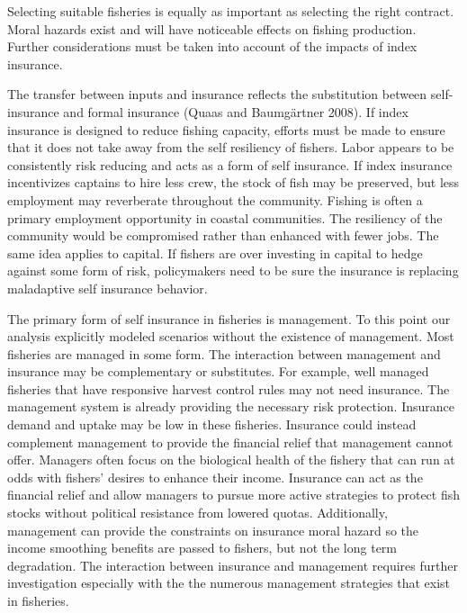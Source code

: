 \documentclass[
  letterpaper,
  DIV=11,
  numbers=noendperiod]{scrartcl}
\theoremstyle{plain}
\theoremstyle{plain}
\theoremstyle{remark}
\begin{document}
Selecting suitable fisheries is equally as important as selecting the
right contract. Moral hazards exist and will have noticeable effects on
fishing production. Further considerations must be taken into account of
the impacts of index insurance.

The transfer between inputs and insurance reflects the substitution
between self-insurance and formal insurance (Quaas and Baumgärtner
2008). If index insurance is designed to reduce fishing capacity,
efforts must be made to ensure that it does not take away from the self
resiliency of fishers. Labor appears to be consistently risk reducing
and acts as a form of self insurance. If index insurance incentivizes
captains to hire less crew, the stock of fish may be preserved, but less
employment may reverberate throughout the community. Fishing is often a
primary employment opportunity in coastal communities. The resiliency of
the community would be compromised rather than enhanced with fewer jobs.
The same idea applies to capital. If fishers are over investing in
capital to hedge against some form of risk, policymakers need to be sure
the insurance is replacing maladaptive self insurance behavior.

The primary form of self insurance in fisheries is management. To this
point our analysis explicitly modeled scenarios without the existence of
management. Most fisheries are managed in some form. The interaction
between management and insurance may be complementary or substitutes.
For example, well managed fisheries that have responsive harvest control
rules may not need insurance. The management system is already providing
the necessary risk protection. Insurance demand and uptake may be low in
these fisheries. Insurance could instead complement management to
provide the financial relief that management cannot offer. Managers
often focus on the biological health of the fishery that can run at odds
with fishers' desires to enhance their income. Insurance can act as the
financial relief and allow managers to pursue more active strategies to
protect fish stocks without political resistance from lowered quotas.
Additionally, management can provide the constraints on insurance moral
hazard so the income smoothing benefits are passed to fishers, but not
the long term degradation. The interaction between insurance and
management requires further investigation especially with the the
numerous management strategies that exist in fisheries.
\end{document}
